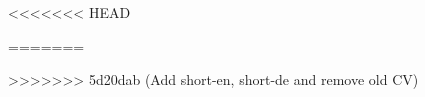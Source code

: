 \documentclass{resume}
\author{Mehrshad Lotfi Foroushani}
\begin{document}
  \maketitle
  \vspace{-0.5cm}
  
<<<<<<< HEAD
  
  
  
  
  
  
=======
  
  
  
  
  
  
>>>>>>> 5d20dab (Add short-en, short-de and remove old CV)
\end{document}
